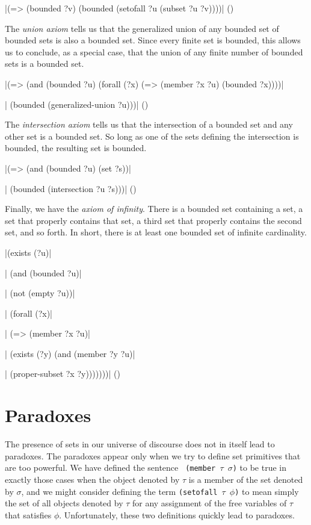 \medskip
\verbatim|(=> (bounded ?v) (bounded (setofall ?u (subset ?u ?v))))|
\hfill(\equation)\par
\medskip

The {\it union axiom} tells us that the generalized union of any bounded set of
bounded sets is also a bounded set.  Since every finite set is bounded, this allows us
to conclude, as a special case, that the union of any finite number of bounded sets
is a bounded set.

\medskip
\verbatim|(=> (and (bounded ?u) (forall (?x) (=> (member ?x ?u) (bounded ?x))))|\par
\verbatim|    (bounded (generalized-union ?u)))|
\hfill(\equation)\par
\medskip

The {\it intersection axiom} tells us that the intersection of a bounded set and any
other set is a bounded set.  So long as one of the sets defining the intersection is
bounded, the resulting set is bounded.

\medskip
\verbatim|(=> (and (bounded ?u) (set ?s))|\par
\verbatim|    (bounded (intersection ?u ?s)))|
\hfill(\equation)\par
\medskip

Finally, we have the {\it axiom of infinity}.  There is a bounded set containing a
set, a set that properly contains that set, a third set that properly contains the
second set, and so forth.  In short, there is at least one bounded set of infinite
cardinality.

\medskip
\verbatim|(exists (?u)|\par\nobreak
\verbatim|  (and (bounded ?u)|\par\nobreak
\verbatim|       (not (empty ?u))|\par\nobreak
\verbatim|       (forall (?x)|\par\nobreak
\verbatim|         (=> (member ?x ?u)|\par\nobreak
\verbatim|             (exists (?y) (and (member ?y ?u)|\par\nobreak
\verbatim|                               (proper-subset ?x ?y)))))))|
\hfill(\equation)\par
\medskip

\section{Paradoxes}

The presence of sets in our universe of discourse does not in itself
lead to paradoxes.  The paradoxes appear only when we try to define
set  primitives that are too powerful.  We have defined the sentence {\tt
(member $\tau$ $\sigma$)} to be true in exactly those cases when the object
denoted by $\tau$ is a member of the set denoted by $\sigma$, and we might
consider defining the term {\tt (setofall $\tau$ $\phi$)} to mean simply the
set of all objects denoted by $\tau$ for any assignment of the free
variables of $\tau$ that satisfies $\phi$.  Unfortunately, these two
definitions quickly lead to paradoxes.


